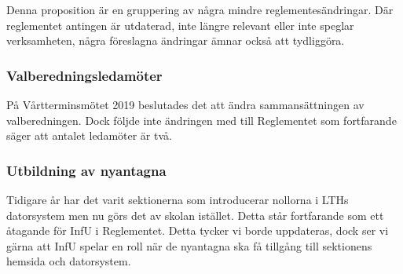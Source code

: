 \documentclass[../_main/handlingar.tex]{subfiles}
\begin{document}

Denna proposition är en gruppering av några mindre reglementesändringar. Där reglementet antingen är utdaterad, inte längre relevant eller inte speglar verksamheten, några föreslagna ändringar ämnar också att tydliggöra.

\subsubsection{Valberedningsledamöter} 

På Vårtterminsmötet 2019 beslutades det att ändra sammansättningen av valberedningen. 
Dock följde inte ändringen med till Reglementet som fortfarande säger att antalet ledamöter är två. 

\subsubsection{Utbildning av nyantagna} 

Tidigare år har det varit sektionerna som introducerar nollorna i LTHs datorsystem men nu görs det av skolan istället. 
Detta står fortfarande som ett åtagande för InfU i Reglementet. Detta tycker vi borde uppdateras, dock ser vi gärna att InfU spelar en roll när de nyantagna ska få tillgång till sektionens hemsida och datorsystem.


\newpage
\end{document}
